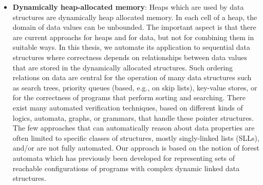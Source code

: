 \begin{itemize}
\item {\bf Dynamically heap-allocated memory}: Heaps which are used by data structures are dynamically heap allocated memory. In each cell of a heap, the domain of data values can be unbounded.
   The important aspect is that there
    are current approachs for heaps and for data, but not for combining them in suitable ways. In this thesis, we automate its application to sequential data structures where correctness depends on relationships between data values that are stored in the dynamically allocated structures. Such ordering relations on data are central for the operation of many data structures such as search trees, priority queues (based, e.g., on skip lists), key-value stores, or for the correctness of programs that perform sorting and searching. There exist many automated verification techniques, based on different kinds of logics, automata, graphs, or grammars, that handle these pointer structures. The few approaches that can automatically reason about data properties are often limited to specific classes of structures, mostly singly-linked lists (SLLs), and/or are not fully automated. Our approach is based on the notion of forest automata which has previously been developed for representing sets of reachable configurations of programs with complex dynamic linked data structures.


\end{itemize}
